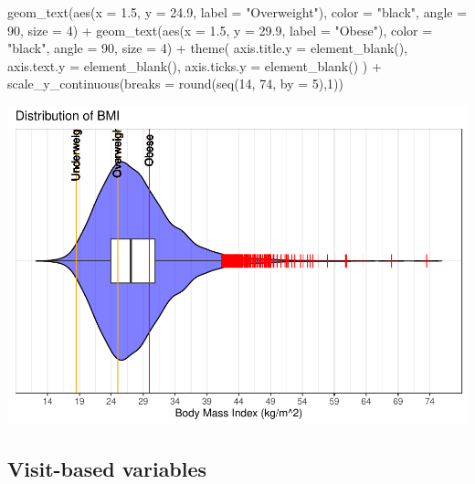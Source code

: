 \documentclass[
  11pt,
]{article}
\newenvironment{Shaded}{\begin{snugshade}}{\end{snugshade}}
\newcommand{\AttributeTok}[1]{\textcolor[rgb]{0.77,0.63,0.00}{#1}}
\newcommand{\DecValTok}[1]{\textcolor[rgb]{0.00,0.00,0.81}{#1}}
\newcommand{\FloatTok}[1]{\textcolor[rgb]{0.00,0.00,0.81}{#1}}
\newcommand{\FunctionTok}[1]{\textcolor[rgb]{0.00,0.00,0.00}{#1}}
\newcommand{\NormalTok}[1]{#1}
\newcommand{\SpecialCharTok}[1]{\textcolor[rgb]{0.00,0.00,0.00}{#1}}
\newcommand{\StringTok}[1]{\textcolor[rgb]{0.31,0.60,0.02}{#1}}
\begin{document}
\begin{Shaded}
\begin{Highlighting}[]
  \FunctionTok{geom\_text}\NormalTok{(}\FunctionTok{aes}\NormalTok{(}\AttributeTok{x =} \FloatTok{1.5}\NormalTok{, }\AttributeTok{y =} \FloatTok{24.9}\NormalTok{, }\AttributeTok{label =} \StringTok{"Overweight"}\NormalTok{), }\AttributeTok{color =} \StringTok{"black"}\NormalTok{, }\AttributeTok{angle =} \DecValTok{90}\NormalTok{, }\AttributeTok{size =} \DecValTok{4}\NormalTok{) }\SpecialCharTok{+}
  \FunctionTok{geom\_text}\NormalTok{(}\FunctionTok{aes}\NormalTok{(}\AttributeTok{x =} \FloatTok{1.5}\NormalTok{, }\AttributeTok{y =} \FloatTok{29.9}\NormalTok{, }\AttributeTok{label =} \StringTok{"Obese"}\NormalTok{), }\AttributeTok{color =} \StringTok{"black"}\NormalTok{, }\AttributeTok{angle =} \DecValTok{90}\NormalTok{, }\AttributeTok{size =} \DecValTok{4}\NormalTok{) }\SpecialCharTok{+}
  \FunctionTok{theme}\NormalTok{(}
    \AttributeTok{axis.title.y =} \FunctionTok{element\_blank}\NormalTok{(),}
    \AttributeTok{axis.text.y =} \FunctionTok{element\_blank}\NormalTok{(),}
    \AttributeTok{axis.ticks.y =} \FunctionTok{element\_blank}\NormalTok{()}
\NormalTok{  ) }\SpecialCharTok{+}
  \FunctionTok{scale\_y\_continuous}\NormalTok{(}\AttributeTok{breaks =} \FunctionTok{round}\NormalTok{(}\FunctionTok{seq}\NormalTok{(}\DecValTok{14}\NormalTok{, }\DecValTok{74}\NormalTok{, }\AttributeTok{by =} \DecValTok{5}\NormalTok{),}\DecValTok{1}\NormalTok{))}
\end{Highlighting}
\end{Shaded}

\includegraphics{figs/Outliers2.pdf}

\hypertarget{visit-based-variables}{%
\subsection{Visit-based variables}\label{visit-based-variables}}
\end{document}
